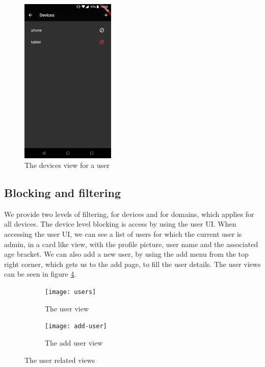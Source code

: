\begin{figure}[th]
\centering
\includegraphics[width=0.4\textwidth]{Figures/devices}
\decoRule
\caption{The devices view for a user}
\label{fig:user-devices}
\end{figure}

\subsection{Blocking and filtering}

We provide two levels of filtering, for devices and for domains, which applies for all devices. The device level blocking is access by using the user UI. When accessing the user UI, we can see a list of users for which the current user is admin, in a card like view, with the profile picture, user name and the associated age bracket. We can also add a new user, by using the add menu from the top right corner, which gets us to the add page, to fill the user details. The user views can be seen in figure \ref{fig:user-views}.

\begin{figure}
\centering
\begin{subfigure}{.5\textwidth}
  \centering
  \texttt{[image: users]}
  \caption{The user view}
  \label{fig:users}
\end{subfigure}%
\begin{subfigure}{.5\textwidth}
  \centering
  \texttt{[image: add-user]}
  \caption{The add user view}
  \label{fig:add-user}
\end{subfigure}
\caption{The user related views}
\label{fig:user-views}
\end{figure}

